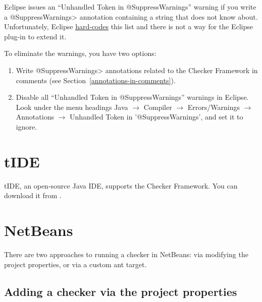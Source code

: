 Eclipse issues an ``Unhandled Token in @SuppressWarnings'' warning if you
write a \<@SuppressWarnings> annotation containing a string that does not
know about.  Unfortunately, Eclipse
\href{https://bugs.eclipse.org/bugs/show_bug.cgi?id=122475}{hard-codes}
this list and there is not a way for the Eclipse plug-in to extend it.

To eliminate the warnings, you have two options:

\begin{enumerate}
\item
Write \<@SuppressWarnings> annotations related to the Checker Framework in
comments (see Section~\ref{annotations-in-comments}).
\item
  Disable all ``Unhandled Token in @SuppressWarnings'' warnings in Eclipse.
  Look under the menu headings Java $\rightarrow$ Compiler $\rightarrow$ Errors/Warnings $\rightarrow$ Annotations $\rightarrow$ Unhandled Token in '@SuppressWarnings', and set it to ignore.
\end{enumerate}


\section{tIDE\label{tide}}

\begin{sloppypar}
tIDE, an open-source Java IDE, supports the Checker Framework.
You can download it from .
\end{sloppypar}


\section{NetBeans\label{netbeans}}

There are two approaches to running a checker in NetBeans:  via modifying the project properties, or via a custom ant target.


\subsection{Adding a checker via the project properties\label{netbeans-project-properties}}

